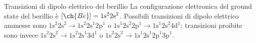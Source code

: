 \begin{example}{Transizioni di dipolo elettrico del berillio}{}
	La configurazione elettronica del ground state del berillio è $ [\ch{Be}] = \text{1s}^2 \text{2s}^2 $. Possibili transizioni di dipolo elettrico ammesse sono $ \text{1s}^2 \text{2s}^2 \rightarrow \text{1s}^2 \text{2s}^1 \text{2p}^1 $ o $ \text{1s}^1 \text{2s}^2 \text{2p}^1 \rightarrow \text{1s}^1 \text{2s}^2 \text{4d}^1 $; transizioni proibite sono invece $ \text{1s}^2 \text{2s}^2 \rightarrow \text{1s}^2 \text{2s}^1 \text{3d}^1 $ o $ \text{1s}^2 \text{2s}^2 \rightarrow \text{1s}^1 \text{2s}^1 \text{2p}^1 \text{3p}^1 $.
\end{example}










